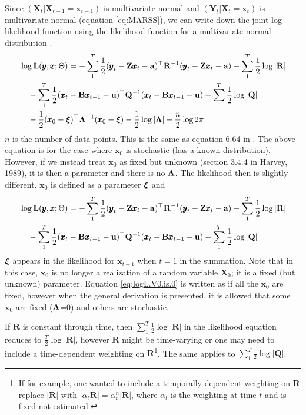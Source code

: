 \documentclass[]{article}
\def\xixi{\mbox{\boldmath $\xi$}}
\def\LAM{\mbox{\boldmath $\Lambda$}}
\def\UPS{\mbox{\boldmath $\Upsilon$}}
\def\XI{\mbox{\boldmath $\Xi$}}
\def\BB{\mbox{$\mathbf B$}}	\def\bb{\mbox{$\mathbf b$}} \def\Bb{\mbox{$\mathbf J$}} \def\Ba{\mbox{$\mathbf L$}} \def\Bm{\UPS}
\def\LL{\mbox{$\mathbf L$}}	\def\ll{\mbox{$\mathbf l$}}
\def\QQ{\mbox{$\mathbf Q$}}	 \def\qq{\mbox{$\mathbf q$}} \def\Qb{\mbox{$\mathbf G$}}  \def\Qm{\mathbb{Q}}
\def\RR{\mbox{$\mathbf R$}}	 \def\rr{\mbox{$\mathbf r$}} \def\Rb{\mbox{$\mathbf H$}}	\def\Rm{\mathbb{R}}
\def\XX{\mbox{$\pmb{X}$}}	\def\xx{\mbox{$\pmb{x}$}}
\def\YY{\mbox{$\pmb{Y}$}}	\def\yy{\mbox{$\pmb{y}$}}
\def\ZZ{\mbox{$\mathbf Z$}}	\def\zz{\mbox{$\mathbf z$}}	\def\Zb{\mbox{$\mathbf M$}} \def\Za{\mbox{$\mathbf N$}} \def\Zm{\XI}
\begin{document}
Since $(\XX_t|\XX_{t-1}=\xx_{t-1})$ is multivariate normal and $(\YY_t|\XX_t=\xx_t)$ is multivariate normal (equation \ref{eq:MARSS}), we can write down the joint log-likelihood function using the likelihood function for a multivariate normal distribution \citep[section 4.3]{JohnsonWichern2007}.  
\begin{equation}\label{eq:logL}
\begin{split}
&\log\LL(\yy,\xx ; \Theta) = -\sum_1^T \frac{1}{2}(\yy_t - \ZZ \xx_t - \aa)^\top \RR^{-1} (\yy_t - \ZZ \xx_t - \aa) -\sum_1^T\frac{1}{2} \log |\RR|\\
&\quad  -\sum_1^T \frac{1}{2} (\xx_t - \BB \xx_{t-1} - \uu)^\top \QQ^{-1} (\xx_t - \BB \xx_{t-1} - \uu) - \sum_1^T\frac{1}{2}\log |\QQ|\\
&\quad  -\frac{1}{2}(\xx_0 - \xixi)^\top \LAM^{-1}(\xx_0 - \xixi) - \frac{1}{2}\log |\LAM| -   \frac{n}{2}\log 2\pi 
\end{split}
\end{equation}
$n$ is the number of data points. This is the same as equation 6.64 in \citet{ShumwayStoffer2006}. The above equation is for the case where $\xx_0$ is stochastic (has a known distribution).  However, if we instead treat $\xx_0$ as fixed but unknown (section 3.4.4 in Harvey, 1989), it is then a parameter and there is no $\LAM$.  The likelihood then is slightly different.  $\xx_0$ is defined as a parameter $\xixi$ and
\begin{equation}\label{eq:logL.V0.is.0}
\begin{split}
&\log\LL(\yy,\xx ; \Theta) = -\sum_1^T \frac{1}{2}(\yy_t - \ZZ \xx_t - \aa)^\top \RR^{-1} (\yy_t - \ZZ \xx_t - \aa) -\sum_1^T\frac{1}{2} \log |\RR|\\
&\quad  -\sum_1^T \frac{1}{2} (\xx_t - \BB \xx_{t-1} - \uu)^\top \QQ^{-1} (\xx_t - \BB \xx_{t-1} - \uu) - \sum_1^T\frac{1}{2}\log |\QQ|
\end{split}
\end{equation}
$\xixi$ appears in the likelihood for $\xx_{t-1}$ when $t=1$ in the summation. Note that in this case, $\xx_0$ is no longer a realization of a random variable $\XX_0$; it is a fixed (but unknown) parameter.  Equation \ref{eq:logL.V0.is.0} is written as if all the $\xx_0$ are fixed, however when the general derivation is presented, it is allowed that some $\xx_0$ are fixed ($\LAM$=0) and others are stochastic.

If $\RR$ is constant through time, then $\sum_1^T\frac{1}{2} \log |\RR|$ in the likelihood equation reduces to $\frac{T}{2}\log |\RR|$, however $\RR$ might be time-varying or one may need to include a time-dependent weighting on $\RR$\footnote{If for example, one wanted to include a temporally dependent weighting on $\RR$ replace $|\RR|$ with $|\alpha_t\RR|=\alpha_t^n|\RR|$, where $\alpha_t$ is the weighting at time $t$ and is fixed not estimated.}.  The same applies to $\sum_1^T\frac{1}{2}\log |\QQ|$.
\end{document}
